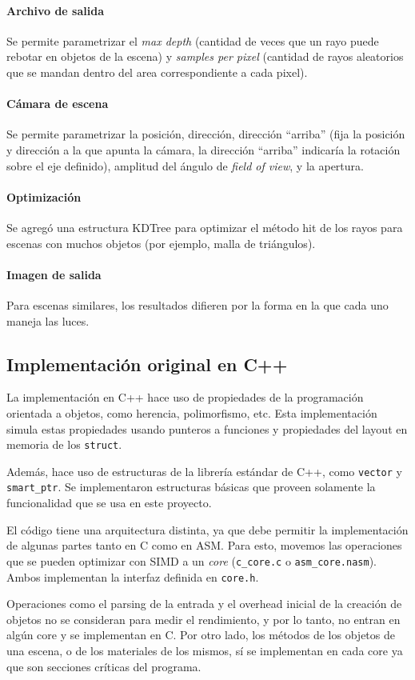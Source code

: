 \paragraph{Archivo de salida} Se permite parametrizar el \textit{max depth}
(cantidad de veces que un rayo puede rebotar en objetos de la escena) y
\textit{samples per pixel} (cantidad de rayos aleatorios que se mandan dentro
del area correspondiente a cada pixel).

\paragraph{Cámara de escena} Se permite parametrizar la posición, dirección,
dirección ``arriba'' (fija la posición y dirección a la que apunta la cámara, la
dirección ``arriba'' indicaría la rotación sobre el eje definido), amplitud del
ángulo de \textit{field of view}, y la apertura.

\paragraph{Optimización} Se agregó una estructura KDTree para optimizar el
método hit de los rayos para escenas con muchos objetos (por ejemplo, malla de
triángulos).

\paragraph{Imagen de salida} Para escenas similares, los resultados difieren por
la forma en la que cada uno maneja las luces.

\subsection{Implementación original en C++}

La implementación en C++ hace uso de propiedades de la programación orientada a
objetos, como herencia, polimorfismo, etc. Esta implementación simula estas
propiedades usando punteros a funciones y propiedades del layout en memoria de
los \texttt{struct}.

Además, hace uso de estructuras de la librería estándar de C++, como
\texttt{vector} y \texttt{smart\_ptr}. Se implementaron estructuras básicas que
proveen solamente la funcionalidad que se usa en este proyecto.

El código tiene una arquitectura distinta, ya que debe permitir la
implementación de algunas partes tanto en C como en ASM. Para esto, movemos las
operaciones que se pueden optimizar con SIMD a un \textit{core}
(\texttt{c\_core.c} o \texttt{asm\_core.nasm}). Ambos implementan la interfaz
definida en \texttt{core.h}.

Operaciones como el parsing de la entrada y el overhead inicial de la creación de
objetos no se consideran para medir el rendimiento, y por lo tanto, no entran en
algún core y se implementan en C. Por otro lado, los métodos de los objetos de
una escena, o de los materiales de los mismos, sí se implementan en cada
core ya que son secciones críticas del programa.
